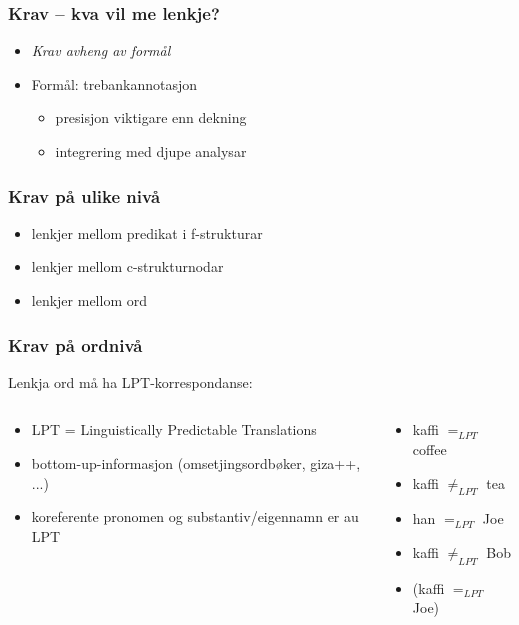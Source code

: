 \documentclass[bigger]{beamer}
\begin{document}
\begin{frame}\frametitle{Krav -- kva vil me lenkje?}
  \begin{itemize}
  \item \emph{Krav avheng av formål}
  \item Formål: trebankannotasjon
    \begin{itemize}
    \item presisjon viktigare enn dekning
    \item integrering med djupe analysar
    \end{itemize}
  \end{itemize}
\end{frame}

\begin{frame}\frametitle{Krav på ulike nivå}
  \begin{itemize}
  \item lenkjer mellom predikat i f-strukturar
  \item lenkjer mellom c-strukturnodar
  \item lenkjer mellom ord %
  \end{itemize}
\end{frame}

\begin{frame}\frametitle{Krav på ordnivå}
  Lenkja ord må ha LPT-korrespondanse:
  \begin{columns}
    \begin{column}{0.5\textwidth}
      \begin{itemize}
      \item LPT = Linguistically Predictable Translations
      \item bottom-up-informasjon (omsetjingsordbøker, giza++, ...)
      \item koreferente pronomen og substantiv/eigennamn er au LPT
      \end{itemize}
    \end{column}

    \begin{column}{0.5\textwidth}
      \begin{itemize}
      \item kaffi $=_{LPT}$ coffee
      \item kaffi $\neq_{LPT}$ tea
      \item han $=_{LPT}$ Joe
      \item kaffi $\neq_{LPT}$ Bob
      \item (kaffi $=_{LPT}$ Joe)
      \end{itemize}
    \end{column}
  \end{columns}
\end{frame}
\end{document}
